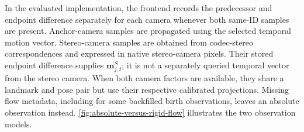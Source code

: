In the evaluated implementation, the frontend records the predecessor and
endpoint difference separately for each camera whenever both same-ID samples
are present. Anchor-camera samples are propagated using the selected temporal
motion vector. Stereo-camera samples are obtained from codec-stereo
correspondences and expressed in native stereo-camera pixels. Their stored
endpoint difference supplies $\mathbf{m}_{j,t}^{S}$; it is not a separately
queried temporal vector from the stereo camera. When both camera factors are
available, they share a landmark and pose pair but use their respective
calibrated projections. Missing flow metadata, including for some backfilled
birth observations, leaves an absolute observation instead.
\autoref{fig:absolute-versus-rigid-flow} illustrates the two observation models.

\begin{figure}[p]
  \centering
\end{figure}
